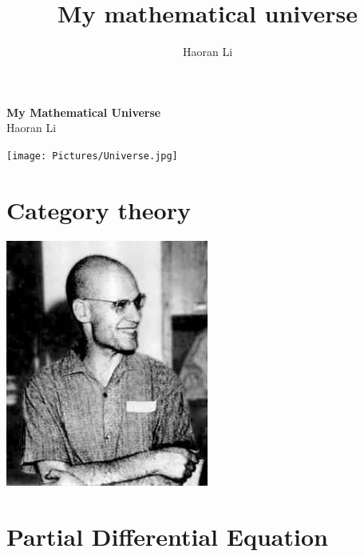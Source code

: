 \documentclass[a4paper,10pt]{book}
\title{My mathematical universe}
\author{Haoran Li}
\date{}
\begin{document}
\sloppy %



\begin{titlepage}
\begin{center}
\vspace*{1cm}
\Huge
\textbf{My Mathematical Universe} \\
\vspace{1cm}
\Large
Haoran Li \\
\vspace{3cm}
\begin{center}
\texttt{[image: Pictures/Universe.jpg]}
\end{center}
\end{center}
\end{titlepage}



\tableofcontents
\let\tableofcontents\relax
\newpage


\chapter{Category theory}

\begin{center}
\includegraphics[width=0.5\textwidth]{Pictures/Alexander_Grothendieck.jpg}
\end{center}
\newpage



\chapter{Partial Differential Equation}

\newpage







\printindex
\end{document}
